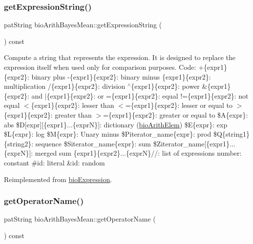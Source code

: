 \subsubsection{\texorpdfstring{get\+Expression\+String()}{getExpressionString()}}
{\footnotesize\ttfamily pat\+String bio\+Arith\+Bayes\+Mean\+::get\+Expression\+String (\begin{DoxyParamCaption}{ }\end{DoxyParamCaption}) const\hspace{0.3cm}{\ttfamily [virtual]}}

Compute a string that represents the expression. It is designed to replace the expression itself when used only for comparison purposes. Code\+: +\{expr1\}\{expr2\}\+: binary plus -\/\{expr1\}\{expr2\}\+: binary minus \{expr1\}\{expr2\}\+: multiplication /\{expr1\}\{expr2\}\+: division $^\wedge$\{expr1\}\{expr2\}\+: power \&\{expr1\}\{expr2\}\+: and $\vert$\{expr1\}\{expr2\}\+: or =\{expr1\}\{expr2\}\+: equal !=\{expr1\}\{expr2\}\+: not equal $<$\{expr1\}\{expr2\}\+: lesser than $<$=\{expr1\}\{expr2\}\+: lesser or equal to $>$\{expr1\}\{expr2\}\+: greater than $>$=\{expr1\}\{expr2\}\+: greater or equal to \$A\{expr\}\+: abs \$D\mbox{[}expr\mbox{]}\mbox{[}\{expr1\}...\{exprN\}\mbox{]}\+: dictionary (\hyperlink{classbio_arith_elem}{bio\+Arith\+Elem}) \$E\{expr\}\+: exp \$L\{expr\}\+: log \$M\{expr\}\+: Unary minus \$\+Piterator\+\_\+name\{expr\}\+: prod \$Q\{string1\}\{string2\}\+: sequence \$\+Siterator\+\_\+name\{expr\}\+: sum \$\+Ziterator\+\_\+name\mbox{[}\{expr1\}...\{exprN\}\mbox{]}\+: merged sum \{expr1\}\{expr2\}...\{exprN\}//\+: list of expressions number\+: constant \#id\+: literal \&id\+: random 

Reimplemented from \hyperlink{classbio_expression_a3e4b4dca58dbbc6f0e411b30eb3f60b4}{bio\+Expression}.

\mbox{\label{classbio_arith_bayes_mean_a681e8636e50c05683a0d89170a264ac9}} 
\subsubsection{\texorpdfstring{get\+Operator\+Name()}{getOperatorName()}}
{\footnotesize\ttfamily pat\+String bio\+Arith\+Bayes\+Mean\+::get\+Operator\+Name (\begin{DoxyParamCaption}{ }\end{DoxyParamCaption}) const\hspace{0.3cm}{\ttfamily [virtual]}}

